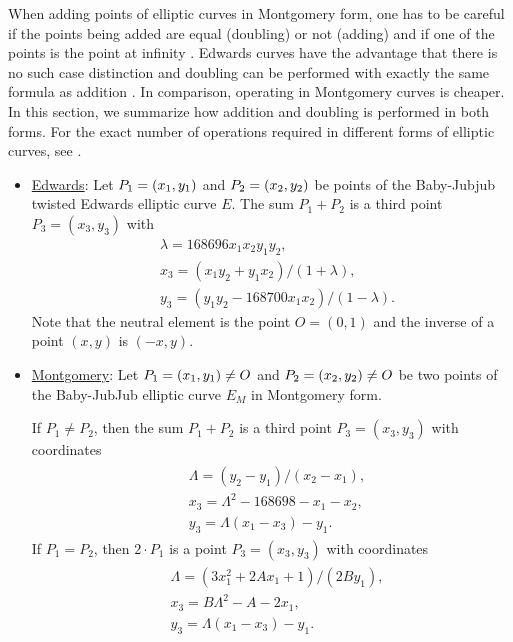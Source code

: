 When adding points of elliptic curves %
in Montgomery form,  
one has to be careful if the points being added are equal (doubling) or not (adding) and if one of the points is the point at infinity \cite{montgomery}. 
%
Edwards curves have the advantage that there is no such case distinction and doubling can be performed with exactly the same formula as addition \cite{twisted}. 
%
In comparison, operating in Montgomery curves is cheaper. In this section, we summarize how addition and doubling is performed in both forms. 
%
For the exact number of operations required in different forms of elliptic curves, see \cite{twisted}.

\begin{itemize}
	
	\item \underline{Edwards}: 	
	Let $P_{1} = (x_{1}, y_{1})$ and $P_{2} = (x_{2}, y_{2})$ be points of the Baby-Jubjub twisted Edwards elliptic curve $E$. The sum $P_1 + P_2$ is a third point $P_3 = (x_3, y_3)$ with 
		\begin{align*}
			&\lambda = 168696 x_1x_2y_1y_2,\\
			&x_3 = (x_1y_2 + y_1x_2) / (1 + \lambda),\\
			&y_3 = (y_1y_2 - 168700 x_1x_2) / (1 - \lambda).
		\end{align*}
	Note that the neutral element is the point $O = (0,1)$ and the inverse of a point $(x,y)$ is $(-x,y)$.

	\item \underline{Montgomery}: 
	Let $P_{1} = (x_{1}, y_{1})\not=O$ and $P_{2} = (x_{2}, y_{2})\not=O$ be two points of the Baby-JubJub elliptic curve $E_M$ in Montgomery form. 
	
	If $P_1\not=P_2$, then the sum $P_1 + P_2$ is a third point $P_3 = (x_3, y_3)$ with coordinates
		\begin{align}
		\label{eq-ted}
		\begin{split}
			&\Lambda = (y_2-y_1)/ (x_2-x_1),\\
			&x_3 = \Lambda^2 - 168698 - x_1 - x_2,\\
			&y_3 = \Lambda(x_1- x_3) - y_1.
		\end{split}
		\end{align}
	If $P_1 = P_2$, then $2\cdot P_1$ is a point $P_3 = (x_3, y_3)$ with coordinates
		\begin{align}
		\label{eq-mont}
		\begin{split}
			&\Lambda = (3x_1^2 + 2Ax_1 + 1)/ (2By_1),\\
			&x_3 = B\Lambda^2 - A - 2x_1,\\
			&y_3 = \Lambda(x_1- x_3) - y_1.
		\end{split}	
		\end{align}
	
\end{itemize}